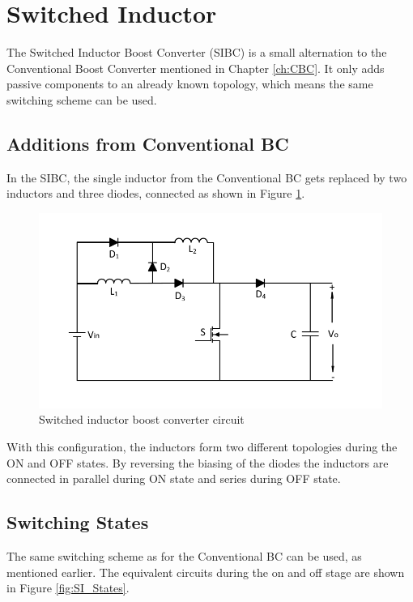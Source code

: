 \section{Switched Inductor}\label{ch:SIBC}
The Switched Inductor Boost Converter (SIBC) is a small alternation to the Conventional Boost Converter mentioned in Chapter \ref{ch:CBC}.
It only adds passive components to an already known topology,
which means the same switching scheme can be used.
\subsection{Additions from Conventional BC}
In the SIBC,
the single inductor from the Conventional BC gets replaced by two inductors and three diodes,
connected as shown in Figure \ref{fig:SwitchedInductor}.

\begin{figure} [H]
   \centering
   \includegraphics[width=\textwidth]{figures/bSwitchedInductor/switched_inductor.pdf}
    \caption{Switched inductor boost converter circuit}
	\label{fig:SwitchedInductor}
\end{figure}


With this configuration,
the inductors form two different topologies during the ON and OFF states. By reversing the biasing of the diodes the inductors are connected in parallel during ON state and series during OFF state.   


\subsection{Switching States}
The same switching scheme as for the Conventional BC can be used,
as mentioned earlier.
The equivalent circuits during the on and off stage are shown in Figure \ref{fig:SI_States}.


